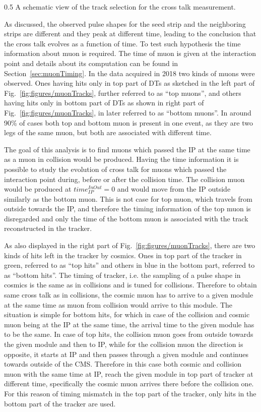                  {0.5}       %
                 { A schematic view of the track selection for the cross talk measurement. }


As discussed, the observed pulse shapes for the seed strip and the neighboring strips are different and they peak at different time, leading to the conclusion that the cross talk evolves as a function of time. To test such hypothesis the time information about muon is required. The time of muon is given at the interaction point and details about its computation can be found in Section~\ref{sec:muonTiming}. In the data acquired in 2018 two kinds of muons were observed. Ones having hits only in top part of DTs as sketched in the left part of Fig.~\ref{fig:figures/muonTracks}, further referred to as ``top muons'',  and others having hits only in bottom part of DTs as shown in right part of Fig.~\ref{fig:figures/muonTracks}, in later referred to as ``bottom muons''. In around 90\% of cases both top and bottom muon is present in one event, as they are two legs of the same muon, but both are associated with different time. 

The goal of this analysis is to find muons which passed the IP at the same time as a muon in collision would be produced. Having the time information it is possible to study the evolution of cross talk for muons which passed the interaction point during, before or after the collision time. The collision muon would be produced at $time_{IP}^{InOut}=0$ and would move from the IP outside similarly as the bottom muon. This is not case for top muon, which travels from outside towards the IP, and therefore the timing information of the top muon is disregarded and only the time of the bottom muon is associated with the track reconstructed in the tracker. 

As also displayed in the right part of Fig.~\ref{fig:figures/muonTracks}, there are two kinds of hits left in the tracker by cosmics. Ones in top part of the tracker in green, referred to as ``top hits'' and others in blue in the bottom part, referred to as ``bottom hits''. The timing of tracker, i.e. the sampling of a pulse shape in cosmics is the same as in collisions and is tuned for collisions. Therefore to obtain same cross talk as in collisions, the cosmic muon has to arrive to a given module at the same time as muon from collision would arrive to this module. The situation is simple for bottom hits, for which in case of the collision and cosmic muon being at the IP at the same time, the arrival time to the given module has to be the same. In case of top hits, the collision muon goes from outside towards the given module and then to IP, while for the collision muon the direction is opposite, it starts at IP and then passes through a given module and continues towards outside of the CMS. Therefore in this case both cosmic and collision muon with the same time at IP, reach the given module in top part of tracker at different time, specifically the cosmic muon arrives there before the collision one. For this reason of timing mismatch in the top part of the tracker, only hits in the bottom part of the tracker are used.

